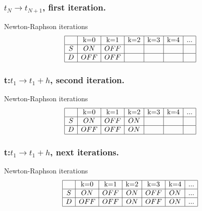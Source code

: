 \frame
{

\frametitle{$t_N \to t_{N+1}$, first iteration.}
  \begin{figure}[!h]
   \centerline{
   \scalebox{0.9}{
    
    }
 } 
 \end{figure}
  \begin{block}{Newton-Raphson iterations}
\begin{equation}
\begin{array}{|c|c|c|c|c|c|c|}
\hline
&$k=0$&$k=1$&$k=2$&$k=3$&$k=4$&...\\
\hline
S&ON&OFF&&&&\\
\hline
D&OFF&OFF&&&&\\
\hline
\end{array}
\end{equation}
\end{block}

 }
  \frame
{

\frametitle{t:$t_1 \to t_1+h$, second iteration.}
  \begin{figure}[!h]
   \centerline{
   \scalebox{0.9}{
    
    }
 } 
 \end{figure}
  \begin{block}{Newton-Raphson iterations}
\begin{equation}
\begin{array}{|c|c|c|c|c|c|c|}
\hline
&$k=0$&$k=1$&$k=2$&$k=3$&$k=4$&...\\
\hline
S&ON&OFF&ON&&&\\
\hline
D&OFF&OFF&ON&&&\\
\hline
\end{array}
\end{equation}
\end{block}


 }
  \frame
{

\frametitle{t:$t_1 \to t_1+h$, next iterations.}
  \begin{figure}[!h]
   \centerline{
   \scalebox{0.9}{
    
    }
 } 
 \end{figure}
   \begin{block}{Newton-Raphson iterations}
\begin{equation}
\begin{array}{|c|c|c|c|c|c|c|}
\hline
&$k=0$&$k=1$&$k=2$&$k=3$&$k=4$&...\\
\hline
S&ON&OFF&ON&OFF&ON&...\\
\hline
D&OFF&OFF&ON&OFF&ON&...\\
\hline
\end{array}
\end{equation}
\end{block}

 }


